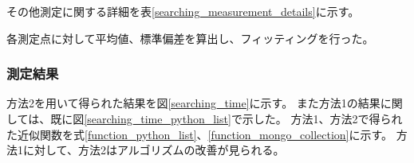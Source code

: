 その他測定に関する詳細を表\ref{searching_measurement_details}に示す。

\begin{table}[tbp]
\begin{center}
\caption[検索機能処理時間測定の詳細]{検索機能処理時間測定の詳細。測定を行った試験結果数、回数、キーワード、検索モード、検索情報の詳細を示している。}
\label{searching_measurement_details}
\end{center}
\end{table}

各測定点に対して平均値、標準偏差を算出し、フィッティングを行った。

\subsubsection{測定結果}

方法2を用いて得られた結果を図\ref{searching_time}に示す。
また方法1の結果に関しては、既に図\ref{searching_time_python_list}で示した。
方法1、方法2で得られた近似関数を式\ref{function_python_list}、\ref{function_mongo_collection}に示す。
方法1に対して、方法2はアルゴリズムの改善が見られる。

